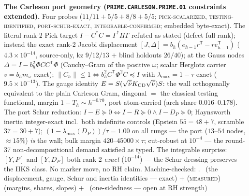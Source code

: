 \par\smallskip\noindent\textbf{The Carleson port geometry
(\texttt{PRIME.CARLESON.\allowbreak PRIME.01} constraints
extended).}
Four probes ($11/11 + 5/5 + 8/8 + 5/5$;
\textsc{pick-scalarized}, \textsc{testing-identified},
\textsc{port-schur-exact}, \textsc{integrable-confirmed};
embedded byte-exact).  The literal rank-2 Pick target $I - C^{*}C
= \Gamma^{*}\Pi\Gamma$ refuted as stated (defect full-rank);
instead the exact rank-2 Jacobi displacement $[J, \Delta] =
b_h(e_{h-1}r^{\mathsf T} - re_{h-1}^{\mathsf T})$
($4.3\times10^{-14}$, source-only, kz $9/12/13$ $+$ blind
holdouts $26/40$); at the Gauss nodes $\Delta = I -
b_h^2\Phi CC^{\mathsf T}\Phi$ (Cauchy--Gram of the positive
$\omega$; scalar Herglotz carrier $v = b_h m_\omega$ exact);
$\|C_h\| \le 1 \Leftrightarrow b_h^2 C^{\mathsf T}\Phi^2 C
\preceq I$ with $\lambda_{\max} = 1 - \tau$ exact
($9.5\times10^{-13}$).  The gauge identity $E =
S(\sqrt{\tilde\nu}K_{\rm CD}\sqrt{\tilde\nu})S$: the wall
orthogonally equivalent to the plain Carleson Gram, diagonal $=$
the classical testing functional, margin $1 - T_h \sim
h^{-0.70}$, port atom-carried (arch share $0.016$--$0.178$).
The port Schur reduction: $I - E \succeq 0 \Leftrightarrow I - R
\succeq 0 \wedge I - D_P \succeq 0$; Haynsworth inertia
integer-exact incl.\ both indefinite controls (Epstein $55 = 48 +
7$, scramble $37 = 30 + 7$); $(1 - \lambda_{\max}(D_P))/\tau =
1.00$ on all rungs --- the port ($13$--$54$ nodes,
${\approx}15\%$) \emph{is} the wall; bulk margin
$420$--$45000\times\tau$; cut-robust at $10^{-4}$ --- the
round-37 non-decompositional demand satisfied as typed.  The
integrable surprise: $[Y, P]$ and $[Y, D_P]$ both rank $2$
\emph{exact} ($10^{-14}$) --- the Schur dressing preserves the
IIKS class.  No marker move, no RH claim.
Machine-checked: .
\mE\ (the displacement, gauge, Schur and inertia identities ---
exact) $+$ (\textsc{measured}) (margins, shares, slopes) $+$
\mO\ (one-sidedness --- open at RH strength)
\par\smallskip


